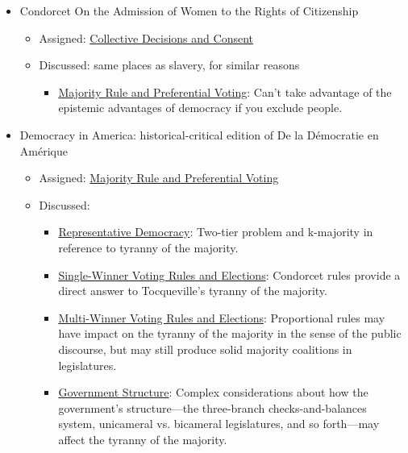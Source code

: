 \begin{itemize}
    \item Condorcet On the Admission of Women to the Rights of Citizenship \autocite{Condorcet1789}
    \begin{itemize}
        \item Assigned:  \hyperref[cur:collective-decisions-consent]{Collective Decisions and Consent}
        \item Discussed:  same places as slavery, for similar reasons
        \begin{itemize}
            \item \hyperref[cur:majority]{Majority Rule and Preferential Voting}:  Can't take advantage of the epistemic advantages of democracy if you exclude people.
        \end{itemize}
    \end{itemize}

    \item Democracy in America: historical-critical edition of De la Démocratie en Amérique \autocite{Tocqueville2010}
    \begin{itemize}
        \item Assigned:  \hyperref[cur:majority]{Majority Rule and Preferential Voting}
        \item Discussed:
        \begin{itemize}
            \item \hyperref[cur:representative-democracy]{Representative Democracy}:  Two-tier problem and k-majority in reference to tyranny of the majority.

            \item \hyperref[cur:single-winner-voting-rules]{Single-Winner Voting Rules and Elections}:  Condorcet rules provide a direct answer to Tocqueville's tyranny of the majority.

            \item \hyperref[cur:multi-winner-voting-rules]{Multi-Winner Voting Rules and Elections}:  Proportional rules may have impact on the tyranny of the majority in the sense of the public discourse, but may still produce solid majority coalitions in legislatures.

            \item \hyperref[cur:government-structure]{Government Structure}:  Complex considerations about how the government's structure—the three-branch checks-and-balances system, unicameral vs. bicameral legislatures, and so forth—may affect the tyranny of the majority.
        \end{itemize}
    \end{itemize}


\end{itemize}
